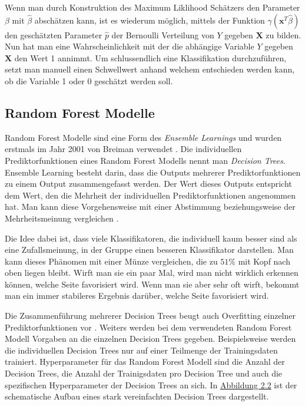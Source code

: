 Wenn man durch Konstruktion des Maximum Liklihood Sch\"atzers den Parameter $\beta$ mit $\hat{\beta}$ absch\"atzen kann, ist es wiederum m\"oglich, mittels der Funktion $\gamma(\mathbf{x}^T\hat{\beta})$
den gesch\"atzten Parameter $\hat{p}$ der Bernoulli Verteilung von $Y$ gegeben $\mathbf{X}$ zu bilden. Nun hat man eine Wahrscheinlichkeit mit der die abh\"angige Variable $Y$ gegeben $\mathbf{X}$ den Wert 1 annimmt.
Um schlussendlich eine Klassifikation durchzuf\"uhren, setzt man manuell einen Schwellwert anhand welchem entschieden werden kann, ob die Variable 1 oder 0 gesch\"atzt werden soll.
























\subsection{Random Forest Modelle}
Random Forest Modelle sind eine Form des \textit{Ensemble Learnings} und wurden erstmals im Jahr 2001 von Breiman verwendet \cite{breiman2001random}.
Die individuellen Prediktorfunktionen eines Random
Forest Modells nennt man \textit{Decision Trees}.
Ensemble Learning besteht darin, dass die Outputs mehrerer Prediktorfunktionen zu einem Output zusammengefasst werden. Der Wert dieses Outputs entspricht
dem Wert, den die Mehrheit der individuellen Prediktorfunktionen angenommen hat.
Man kann diese Vorgehensweise mit einer Abstimmung beziehungsweise der Mehrheitsmeinung vergleichen \cite[Seiten 189 bis 191]{handson}.

Die Idee dabei ist, dass viele Klassifikatoren, die individuell kaum besser sind als eine Zufallsmeinung, in der Gruppe einen
besseren Klassifikator darstellen. Man kann dieses Ph\"anomen mit einer M\"unze vergleichen, die zu $51\%$ mit Kopf nach oben liegen bleibt. Wirft
man sie ein paar Mal, wird man nicht wirklich erkennen k\"onnen, welche Seite favorisiert wird. Wenn man sie aber sehr oft wirft, bekommt man
ein immer stabileres Ergebnis dar\"uber, welche Seite favorisiert wird.

Die Zusammenf\"uhrung mehrerer Decision Trees beugt auch Overfitting einzelner Prediktorfunktionen vor \cite[Seiten 255 und 256]{shalev}. Weiters
werden bei dem verwendeten Random Forest Modell Vorgaben an die einzelnen
Decision Trees gegeben. Beispielsweise werden die individuellen Decision Trees nur auf einer Teilmenge der Trainingsdaten trainiert. Hyperparameter f\"ur das Random Forest Modell sind
die Anzahl der Decision Trees, die Anzahl der Trainigsdaten pro Decision Tree und auch die spezifischen Hyperparameter der Decision Trees an sich. In \hyperref[fig:rf1]{Abbildung 2.2} ist der schematische Aufbau
eines stark vereinfachten Decision Trees dargestellt.

